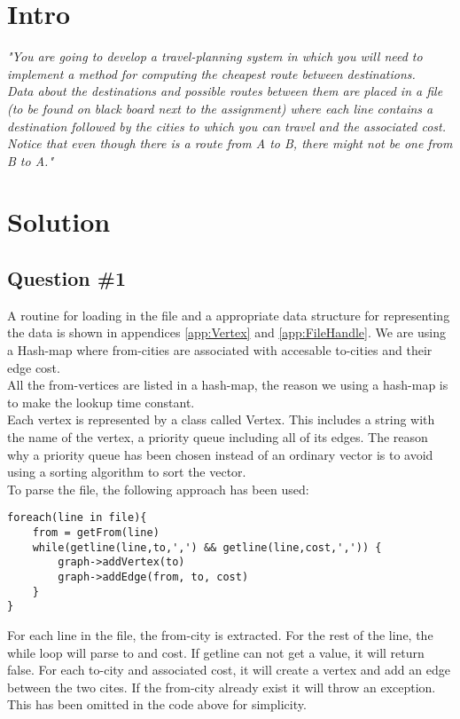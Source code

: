 \section{Intro}
\label{sec:intro}
\textit{"You are going to develop a travel-planning system in which you will need to implement a method for computing the cheapest route between destinations. \\
Data about the destinations and possible routes between them are placed in a file (to be found on black board next to the assignment) where each line contains a destination followed by the cities to which you can travel and the associated cost. \\
Notice that even though there is a route from A to B, there might not be one from B to A."}


\section{Solution}
\subsection{Question \#1}
A routine for loading in the file and a appropriate data structure for representing the data is shown in appendices  \ref{app:Vertex} and \ref{app:FileHandle}. We are using a Hash-map where from-cities are associated with accesable to-cities and their edge cost.\\
All the from-vertices are listed in a hash-map, the reason we using a hash-map is to make the lookup time constant. \\
Each vertex is represented by a class called Vertex. This includes a string with the name of the vertex, a priority queue including all of its edges. The reason why a priority queue has been chosen instead of an ordinary vector is to avoid using a sorting algorithm to sort the vector.\\
To parse the file, the following approach has been used:
\bigskip
\begin{lstlisting}
foreach(line in file){
	from = getFrom(line)
	while(getline(line,to,',') && getline(line,cost,',')) {
		graph->addVertex(to)
		graph->addEdge(from, to, cost)
	}	
}
\end{lstlisting}
\bigskip
For each line in the file, the from-city is extracted. For the rest of the line, the while loop will parse to and cost. If getline can not get a value, it will return false. For each to-city and associated cost, it will create a vertex and add an edge between the two cites. If the from-city already exist it will throw an exception. This has been omitted in the code above for simplicity.


